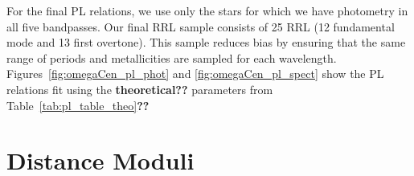 \documentclass[a4paper,fleqn,usenatbib]{mnras}
\begin{document}

For the final PL relations, we use only the stars for which we have photometry in all five bandpasses. Our final RRL sample consists of 25 RRL (12 fundamental mode and 13 first overtone). This sample reduces bias by ensuring that the same range of periods and metallicities are sampled for each wavelength. Figures~\ref{fig:omegaCen_pl_phot} and \ref{fig:omegaCen_pl_spect} show the PL relations fit using the {\bf theoretical??} parameters from Table~\ref{tab:pl_table_theo}{\bf??}

\section{Distance Moduli}
\label{sec:distance_moduli}
\end{document}
